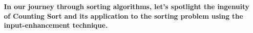 \documentclass[preview]{standalone}
\begin{document}
\begin{center}
\textbf{In our journey through sorting algorithms, let's spotlight the ingenuity of Counting Sort and its application to the sorting problem using the input-enhancement technique.}
\end{center}
\end{document}

